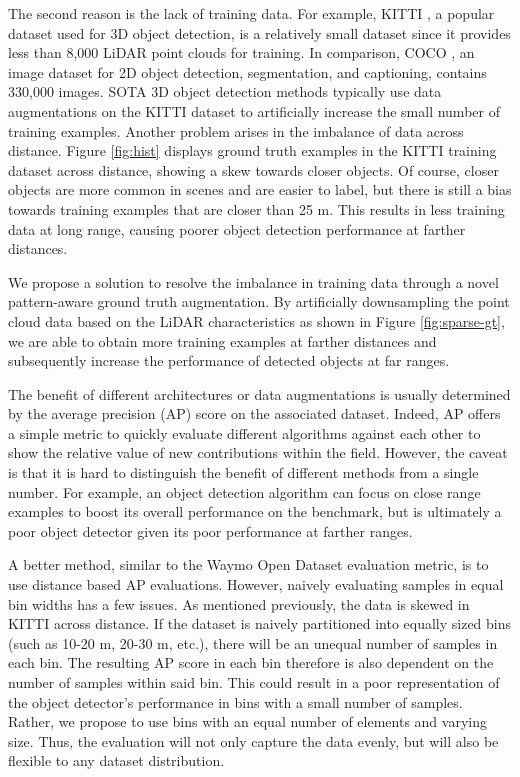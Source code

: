 \documentclass[10pt, conference, compsocconf]{IEEEtran}
\begin{document}
The second reason is the lack of training data. For example, KITTI \cite{Geiger2012}, a popular dataset used for 3D object detection, is a relatively small dataset since it provides less than 8,000 LiDAR point clouds for training. In comparison, COCO \cite{Lin2014}, an image dataset for 2D object detection, segmentation, and captioning,
contains 330,000 images. SOTA 3D object detection methods typically use data augmentations on the KITTI dataset to artificially increase the small number of training examples. Another problem arises in the imbalance of data across distance. Figure \ref{fig:hist} displays ground truth examples in the KITTI training dataset across distance, showing a skew towards closer objects. Of course, closer objects are more common in scenes and are easier to label, but there is still a bias towards training examples that are closer than 25 m. This results in less training data at long range, causing poorer object detection performance at farther distances.

We propose a solution to resolve the imbalance in training data through a novel pattern-aware ground truth augmentation. By artificially downsampling the point cloud data based on the LiDAR characteristics as shown in Figure \ref{fig:sparse-gt}, we are able to obtain more training examples at farther distances and subsequently increase the performance of detected objects at far ranges.

The benefit of different architectures or data augmentations is usually determined by the average precision (AP) score on the associated dataset. Indeed, AP offers a simple metric to quickly evaluate different algorithms against each other to show the relative value of new contributions within the field. However, the caveat is that it is hard to distinguish the benefit of different methods from a single number. For example, an object detection algorithm can focus on close range examples to boost its overall performance on the benchmark, but is ultimately a poor object detector given its poor performance at farther ranges.

A better method, similar to the Waymo Open Dataset \cite{Sun2020} evaluation metric, is to use distance based AP evaluations. However, naively evaluating samples in equal bin widths has a few issues. As mentioned previously, the data is skewed in KITTI across distance. If the dataset is naively partitioned into equally sized bins (such as 10-20 m, 20-30 m, etc.), there will be an unequal number of samples in each bin. The resulting AP score in each bin therefore is also dependent on the number of samples within said bin. This could result in a poor representation of the object detector's performance in bins with a small number of samples. Rather, we propose to use bins with an equal number of elements and varying size. Thus, the evaluation will not only capture the data evenly, but will also be flexible to any dataset distribution.
\end{document}
